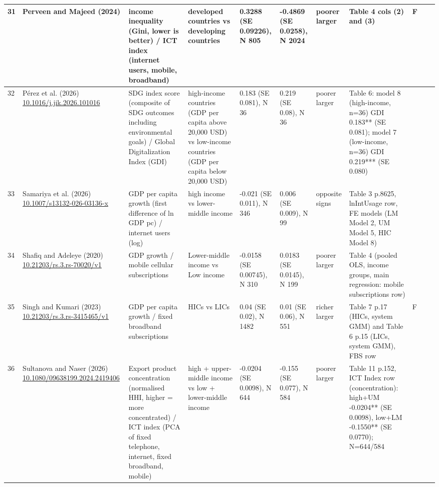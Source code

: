 \documentclass[10pt,a4paper]{article}
\begin{document}
\begin{longtable}{@{}p{0.4cm}p{2.4cm}p{2.6cm}p{3.0cm}p{2.6cm}p{2.6cm}p{1.5cm}p{5.6cm}p{0.3cm}p{1.0cm}p{1.6cm}@{}}
31 & Perveen and Majeed (2024) & income inequality (Gini, lower is better) / ICT index (internet users, mobile, broadband) & developed countries vs developing countries & 0.3288 (SE 0.09226), N 805 & -0.4869 (SE 0.0258), N 2024 & poorer larger & Table 4 cols (2) and (3) & F &  &  \\ \midrule
32 & Pérez et al. (2026) \newline \url{10.1016/j.jik.2026.101016} & SDG index score (composite of SDG outcomes including environmental goals) / Global Digitalization Index (GDI) & high-income countries (GDP per capita above 20,000 USD) vs low-income countries (GDP per capita below 20,000 USD) & 0.183 (SE 0.081), N 36 & 0.219 (SE 0.08), N 36 & poorer larger & Table 6: model 8 (high-income, n=36) GDI 0.183** (SE 0.081); model 7 (low-income, n=36) GDI 0.219*** (SE 0.080) &  &  &  \\ \midrule
33 & Samariya et al. (2026) \newline \url{10.1007/s13132-026-03136-x} & GDP per capita growth (first difference of ln GDP pc) / internet users (log) & high income vs lower-middle income & -0.021 (SE 0.011), N 346 & 0.006 (SE 0.009), N 99 & opposite signs & Table 3 p.8625, lnIntUsage row, FE models (LM Model 2, UM Model 5, HIC Model 8) &  &  &  \\ \midrule
34 & Shafiq and Adeleye (2020) \newline \url{10.21203/rs.3.rs-70020/v1} & GDP growth / mobile cellular subscriptions & Lower-middle income vs Low income & -0.0158 (SE 0.00745), N 310 & 0.0183 (SE 0.0145), N 199 & poorer larger & Table 4 (pooled OLS, income groups, main regression: mobile subscriptions row) &  &  &  \\ \midrule
35 & Singh and Kumari (2023) \newline \url{10.21203/rs.3.rs-3415465/v1} & GDP per capita growth / fixed broadband subscriptions & HICs vs LICs & 0.04 (SE 0.02), N 1482 & 0.01 (SE 0.06), N 551 & richer larger & Table 7 p.17 (HICs, system GMM) and Table 6 p.15 (LICs, system GMM), FBS row & F &  &  \\ \midrule
36 & Sultanova and Naser (2026) \newline \url{10.1080/09638199.2024.2419406} & Export product concentration (normalised HHI, higher = more concentrated) / ICT index (PCA of fixed telephone, internet, fixed broadband, mobile) & high + upper-middle income vs low + lower-middle income & -0.0204 (SE 0.0098), N 644 & -0.155 (SE 0.077), N 584 & poorer larger & Table 11 p.152, ICT Index row (concentration): high+UM -0.0204** (SE 0.0098), low+LM -0.1550** (SE 0.0770); N=644/584 &  &  &  \\ \midrule

\end{longtable}
\end{document}
